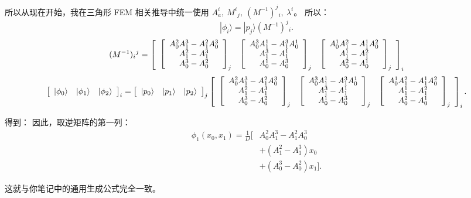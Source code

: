 所以从现在开始，我在三角形 FEM 相关推导中统一使用 \(A^i_a,\ M^i{}_j,\ (M^{-1})^j{}_i,\ \lambda^i\)。
所以：
\[
    \boxed{
    |\phi_i\rangle
    =|p_j\rangle(M^{-1})^j{}_i.
    }
    \tag{1}
\]
\[
    (M^{-1})_{i}{}^{j}
    =\tarrf{ccc}{
        \tarrf{ccc}{
            A^2_0A^3_1-A^2_1A^3_0
            \\
            A^2_1-A^3_1
            \\
            A^3_0-A^2_0
        }_j
        &
        \tarrf{ccc}{
            A^3_0A^1_1-A^3_1A^1_0
            \\
            A^3_1-A^1_1
            \\
            A^1_0-A^3_0
        }_j
        &
        \tarrf{ccc}{
            A^1_0A^2_1-A^1_1A^2_0
            \\
            A^1_1-A^2_1
            \\
            A^2_0-A^1_0
        }_j
    }_i
\]
\[
    \left[\begin{array}{ccc}\ket{\phi_0}&\ket{\phi_1}&\ket{\phi_2}\end{array}\right]_{i}
    =
    \left[\begin{array}{ccc}\ket{p_0}&\ket{p_1}&\ket{p_2}\end{array}\right]_{j}
    \tarrf{ccc}{
        \tarrf{ccc}{
            A^2_0A^3_1-A^2_1A^3_0
            \\
            A^2_1-A^3_1
            \\
            A^3_0-A^2_0
        }_j
        &
        \tarrf{ccc}{
            A^3_0A^1_1-A^3_1A^1_0
            \\
            A^3_1-A^1_1
            \\
            A^1_0-A^3_0
        }_j
        &
        \tarrf{ccc}{
            A^1_0A^2_1-A^1_1A^2_0
            \\
            A^1_1-A^2_1
            \\
            A^2_0-A^1_0
        }_j
    }_i.
\]

得到：
因此，取逆矩阵的第一列：
\[
    \boxed{
        \begin{aligned}
            \phi_1(x_0,x_1)=\frac1D\Big[
             & A^2_0A^3_1-A^2_1A^3_0 \\
             & +(A^2_1-A^3_1)x_0     \\
             & +(A^3_0-A^2_0)x_1
                \Big].
        \end{aligned}
    }
\]

这就与你笔记中的通用生成公式完全一致。


